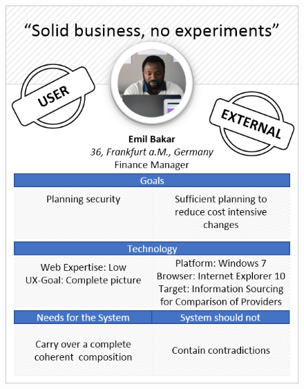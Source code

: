 \begin{figure}[H] 
        \centering\includegraphics[width=\textwidth]{img/diagrams/personas/customer3.png}
	\captionsetup{labelformat=empty}
        \caption[]{}
\end{figure}
